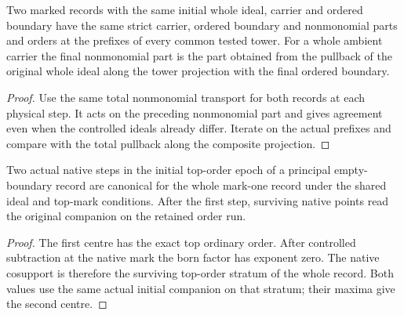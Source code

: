 \begin{theorem}
\label{hir:g8-common-tower-nonmonomial-orders}
\leanok
Two marked records with the same initial whole ideal,
carrier and ordered boundary have the same strict carrier,
ordered boundary and nonmonomial parts and orders at the
prefixes of every common tested tower. For a whole ambient
carrier the final nonmonomial part is the part obtained from
the pullback of the original whole ideal along the tower
projection with the final ordered boundary.
\end{theorem}
\begin{proof}
Use the same total nonmonomial transport for both records
at each physical step. It acts on the preceding nonmonomial
part and gives agreement even when the controlled ideals
already differ. Iterate on the actual prefixes and compare
with the total pullback along the composite projection.
\end{proof}

\begin{theorem}
\label{hir:g8-principal-retained-epoch}
\leanok
Two actual native steps in the initial top-order epoch of
a principal empty-boundary record are canonical for the
whole mark-one record under the shared ideal and top-mark
conditions. After the first step, surviving native points
read the original companion on the retained order run.
\end{theorem}
\begin{proof}
The first centre has the exact top ordinary order. After
controlled subtraction at the native mark the born factor
has exponent zero. The native cosupport is therefore the
surviving top-order stratum of the whole record. Both
values use the same actual initial companion on that stratum;
their maxima give the second centre.
\end{proof}

